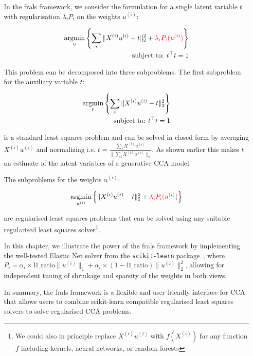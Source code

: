 In the \acrshort{frals} framework, we consider the formulation for a single latent variable \(t\) with regularisation \(\lambda_i P_i\) on the weights \(u^{(i)}\):

\begin{align}
    \underset{u}{\mathrm{argmin}}\left\{\sum_i \|X^{(i)} u^{(i)} - t\|_2^2 + \textcolor{red}{\lambda_i P_i(u^{(i)})} \right\}\\
    \text{subject to: }t^\top t = 1 \notag
\end{align}

This problem can be decomposed into three subproblems.
The first subproblem for the auxiliary variable \(t\):

\begin{align}
    \underset{t}{\mathrm{argmin}}\left\{\sum_i \|X^{(i)} u^{(i)} - t\|_2^2\right\}\\
    \text{subject to: }t^\top t = 1 \notag
\end{align}

is a standard least squares problem and can be solved in closed form by averaging \(X^{(i)} u^{(i)}\) and normalizing i.e. \(t = \frac{\sum_i X^{(i)} u^{(i)}}{\|\sum_i X^{(i)} u^{(i)}\|_2}\).
As shown earlier this makes \(t\) an estimate of the latent variables of a generative CCA model.

The subproblems for the weights \(u^{(i)}\):

\begin{align}
    \underset{u^{(i)}}{\mathrm{argmin}}\left\{\|X^{(i)} u^{(i)} - t\|_2^2 + \textcolor{red}{\lambda_i P_i(u^{(i)})} \right\}
\end{align}

are regularised least squares problems that can be solved using any suitable regularised least squares solver\footnote{We could also in principle replace $X^{(i)} u^{(i)}$ with $f(X^{(i)})$ for any function $f$ including kernels, neural networks, or random forests}.

In this chapter, we illustrate the power of the \acrshort{frals} framework by implementing the well-tested Elastic Net solver from the \texttt{scikit-learn} package~\citep{pedregosa2011scikit}, where \(P_i = \alpha_i \times \text{l1\_ratio} \|u^{(i)}\|_1 + \alpha_i \times (1-\text{l1\_ratio}) \|u^{(i)}\|_2^2\), allowing for independent tuning of shrinkage and sparsity of the weights in both views.

In summary, the \acrshort{frals} framework is a flexible and user-friendly interface for CCA that allows users to combine scikit-learn compatible regularised least squares solvers to solve regularised CCA problems.


